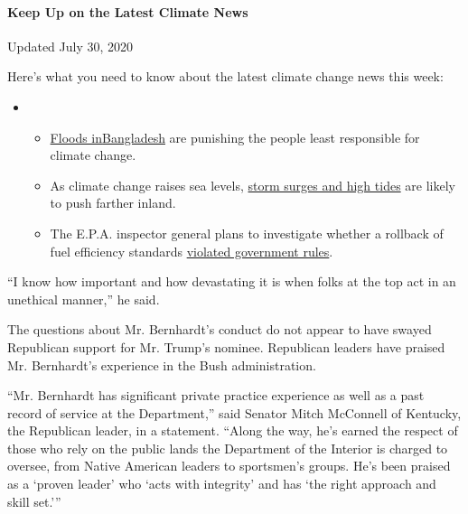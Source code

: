\hypertarget{keep-up-on-the-latest-climate-news}{%
\paragraph{Keep Up on the Latest Climate
News}\label{keep-up-on-the-latest-climate-news}}

Updated July 30, 2020

Here's what you need to know about the latest climate change news this
week:

\begin{itemize}
\item
  \begin{itemize}
  \tightlist
  \item
    \href{https://www.nytimes.com/2020/07/30/climate/bangladesh-floods.html?action=click\&pgtype=Article\&state=default\&region=MAIN_CONTENT_1\&context=storylines_keepup}{Floods
    in}\href{https://www.nytimes.com/2020/07/30/climate/bangladesh-floods.html?action=click\&pgtype=Article\&state=default\&region=MAIN_CONTENT_1\&context=storylines_keepup}{Bangladesh}
    are punishing the people least responsible for climate change.
  \item
    As climate change raises sea levels,
    \href{https://www.nytimes.com/2020/07/30/climate/sea-level-inland-floods.html?action=click\&pgtype=Article\&state=default\&region=MAIN_CONTENT_1\&context=storylines_keepup}{storm
    surges and high tides} are likely to push farther inland.
  \item
    The E.P.A. inspector general plans to investigate whether a rollback
    of fuel efficiency standards
    \href{https://www.nytimes.com/2020/07/27/climate/trump-fuel-efficiency-rule.html?action=click\&pgtype=Article\&state=default\&region=MAIN_CONTENT_1\&context=storylines_keepup}{violated
    government rules}.
  \end{itemize}
\end{itemize}

``I know how important and how devastating it is when folks at the top
act in an unethical manner,'' he said.

The questions about Mr. Bernhardt's conduct do not appear to have swayed
Republican support for Mr. Trump's nominee. Republican leaders have
praised Mr. Bernhardt's experience in the Bush administration.

``Mr. Bernhardt has significant private practice experience as well as a
past record of service at the Department,'' said Senator Mitch McConnell
of Kentucky, the Republican leader, in a statement. ``Along the way,
he's earned the respect of those who rely on the public lands the
Department of the Interior is charged to oversee, from Native American
leaders to sportsmen's groups. He's been praised as a `proven leader'
who `acts with integrity' and has `the right approach and skill set.'''

